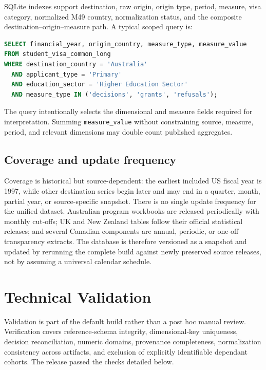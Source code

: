 \documentclass[runningheads]{llncs}
\begin{document}
SQLite indexes support destination, raw origin, origin type, period, measure, visa category, normalized M49 country, normalization status, and the composite destination--origin--measure path. A typical scoped query is:

\begin{lstlisting}[style=code,language=SQL]
SELECT financial_year, origin_country, measure_type, measure_value
FROM student_visa_common_long
WHERE destination_country = 'Australia'
  AND applicant_type = 'Primary'
  AND education_sector = 'Higher Education Sector'
  AND measure_type IN ('decisions', 'grants', 'refusals');
\end{lstlisting}

The query intentionally selects the dimensional and measure fields required for interpretation. Summing \texttt{measure\_value} without constraining source, measure, period, and relevant dimensions may double count published aggregates.

\subsection{Coverage and update frequency}

Coverage is historical but source-dependent: the earliest included US fiscal year is 1997, while other destination series begin later and may end in a quarter, month, partial year, or source-specific snapshot. There is no single update frequency for the unified dataset. Australian program workbooks are released periodically with monthly cut-offs; UK and New Zealand tables follow their official statistical releases; and several Canadian components are annual, periodic, or one-off transparency extracts. The database is therefore versioned as a snapshot and updated by rerunning the complete build against newly preserved source releases, not by assuming a universal calendar schedule.

\section{Technical Validation}

Validation is part of the default build rather than a post hoc manual review. Verification covers reference-schema integrity, dimensional-key uniqueness, decision reconciliation, numeric domains, provenance completeness, normalization consistency across artifacts, and exclusion of explicitly identifiable dependant cohorts. The release passed the checks detailed below.
\end{document}
